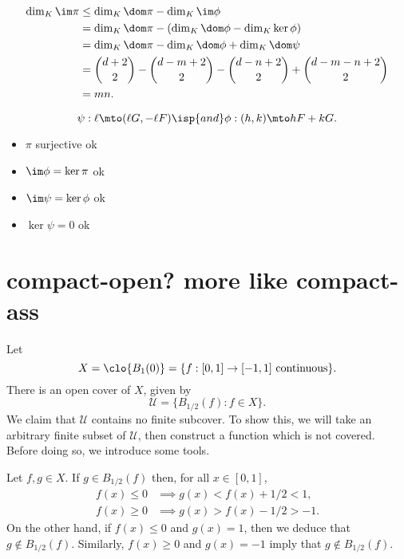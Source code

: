 \documentclass[12pt]{article}
\begin{document}
    \begin{align*}
        \dim_K \im \pi
            &\leq \dim_K \dom \pi - \dim_K \im \phi \\
            &= \dim_K \dom \pi - (\dim_K \dom \phi - \dim_K \ker \phi) \\
            &= \dim_K \dom \pi - \dim_K \dom \phi + \dim_K \dom \psi \\
            &= \binom{d+2}{2} - \binom{d-m+2}{2} - \binom{d-n+2}{2} + \binom{d-m-n+2}{2} \\
            &= mn.
    \end{align*}

    

    \begin{center}
    \end{center}
    \[
        \psi : \ell \mto (\ell G, -\ell F)
        \isp{and}
        \phi : (h, k) \mto hF + kG.
    \]
    \begin{itemize}
        \item $\pi$ surjective ok
        \item $\im \phi = \ker \pi$ ok
        \item $\im \psi = \ker \phi$ ok
        \item $\ker \psi = 0$ ok
    \end{itemize}


\section{compact-open? more like compact-ass}

Let
    \[
        X = \clo{B_1(0)} = \{f : [0, 1] \to [-1, 1] \text{ continuous}\}.
    \]
    There is an open cover of $X$, given by
    \[
        \mathcal{U} = \{B_{1/2}(f) : f \in X\}.
    \]
    We claim that $\mathcal{U}$ contains no finite subcover. To show this, we will take an arbitrary finite subset of $\mathcal{U}$, then construct a function which is not covered. Before doing so, we introduce some tools.

    Let $f, g \in X$. If $g \in B_{1/2}(f)$ then, for all $x \in [0, 1]$,
    \begin{align*}
        f(x) \leq 0 &\implies g(x) < f(x) + 1/2 < 1, \\
        f(x) \geq 0 &\implies g(x) > f(x) - 1/2 > -1.
    \end{align*}
    On the other hand, if $f(x) \leq 0$ and $g(x) = 1$, then we deduce that $g \notin B_{1/2}(f)$. Similarly, $f(x) \geq 0$ and $g(x) = -1$ imply that $g \notin B_{1/2}(f)$.
\end{document}
